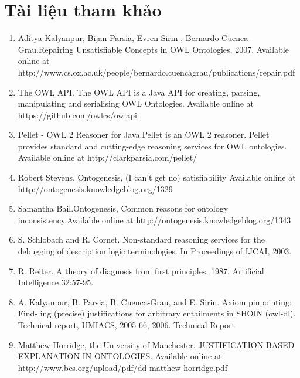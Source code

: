 \chapter{Tài liệu tham khảo}
\begin{enumerate}
\item 
Aditya Kalyanpur, Bijan Parsia, Evren Sirin
, Bernardo Cuenca-Grau.Repairing Unsatisfiable Concepts in OWL Ontologies, 2007. Available online at \\ http://www.cs.ox.ac.uk/people/bernardo.cuencagrau/publications/repair.pdf
\item
The OWL API. The OWL API is a Java API for creating, parsing, manipulating and serialising OWL Ontologies. Available online at
https://github.com/owlcs/owlapi
\item
Pellet - OWL 2 Reasoner for Java.Pellet is an OWL 2 reasoner. Pellet provides standard and cutting-edge reasoning services for OWL ontologies. Available online at http://clarkparsia.com/pellet/
\item 
Robert Stevens. Ontogenesis, (I can’t get no) satisfiability Available online at http://ontogenesis.knowledgeblog.org/1329
\item
Samantha Bail.Ontogenesis, Common reasons for ontology inconsistency.Available online at http://ontogenesis.knowledgeblog.org/1343
\item 
S. Schlobach and R. Cornet. Non-standard reasoning services for the debugging of description logic terminologies. In Proceedings of IJCAI, 2003.
\item
R. Reiter. A theory of diagnosis from first principles. 1987. Artificial Intelligence
32:57-95.
\item
A. Kalyanpur, B. Parsia, B. Cuenca-Grau, and E. Sirin. Axiom pinpointing: Find-
ing (precise) justifications for arbitrary entailments in SHOIN (owl-dl). Technical
report, UMIACS, 2005-66, 2006. Technical Report
\item
Matthew Horridge, the University of Manchester. JUSTIFICATION BASED EXPLANATION IN ONTOLOGIES. Available online at: http://www.bcs.org/upload/pdf/dd-matthew-horridge.pdf
\end{enumerate}


